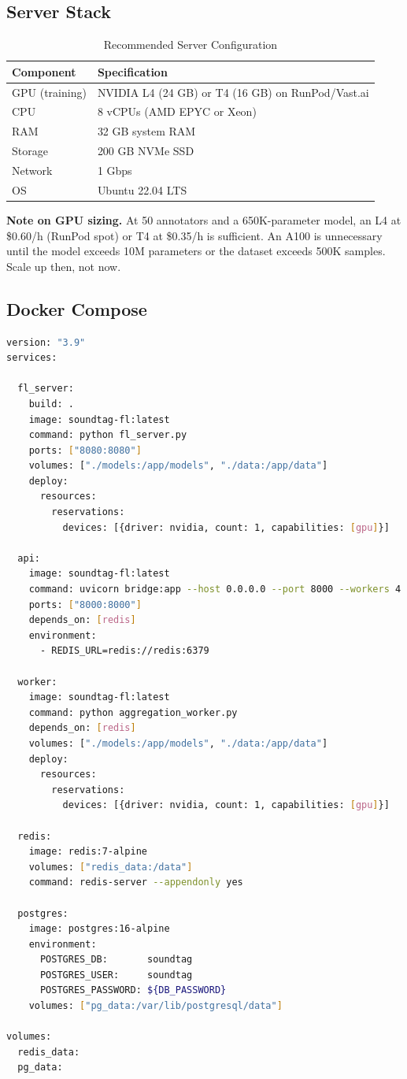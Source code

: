 \documentclass[11pt,a4paper]{article}
\begin{document}
\subsection{Server Stack}

\begin{table}[h]
\centering
\caption{Recommended Server Configuration}
\begin{tabular}{@{}p{4cm}p{8cm}@{}}
\toprule
\textbf{Component} & \textbf{Specification} \\
\midrule
GPU (training) & NVIDIA L4 (24 GB) or T4 (16 GB) on RunPod/Vast.ai \\
CPU & 8 vCPUs (AMD EPYC or Xeon) \\
RAM & 32 GB system RAM \\
Storage & 200 GB NVMe SSD \\
Network & 1 Gbps \\
OS & Ubuntu 22.04 LTS \\
\bottomrule
\end{tabular}
\end{table}

\textbf{Note on GPU sizing.} At 50 annotators and a 650K-parameter model,
an L4 at \$0.60/h (RunPod spot) or T4 at \$0.35/h is sufficient.
An A100 is unnecessary until the model exceeds 10M parameters or the
dataset exceeds 500K samples. Scale up then, not now.

\subsection{Docker Compose}

\begin{lstlisting}[language=bash, caption={docker-compose.yml}]
version: "3.9"
services:

  fl_server:
    build: .
    image: soundtag-fl:latest
    command: python fl_server.py
    ports: ["8080:8080"]
    volumes: ["./models:/app/models", "./data:/app/data"]
    deploy:
      resources:
        reservations:
          devices: [{driver: nvidia, count: 1, capabilities: [gpu]}]

  api:
    image: soundtag-fl:latest
    command: uvicorn bridge:app --host 0.0.0.0 --port 8000 --workers 4
    ports: ["8000:8000"]
    depends_on: [redis]
    environment:
      - REDIS_URL=redis://redis:6379

  worker:
    image: soundtag-fl:latest
    command: python aggregation_worker.py
    depends_on: [redis]
    volumes: ["./models:/app/models", "./data:/app/data"]
    deploy:
      resources:
        reservations:
          devices: [{driver: nvidia, count: 1, capabilities: [gpu]}]

  redis:
    image: redis:7-alpine
    volumes: ["redis_data:/data"]
    command: redis-server --appendonly yes

  postgres:
    image: postgres:16-alpine
    environment:
      POSTGRES_DB:       soundtag
      POSTGRES_USER:     soundtag
      POSTGRES_PASSWORD: ${DB_PASSWORD}
    volumes: ["pg_data:/var/lib/postgresql/data"]

volumes:
  redis_data:
  pg_data:
\end{lstlisting}
\end{document}

